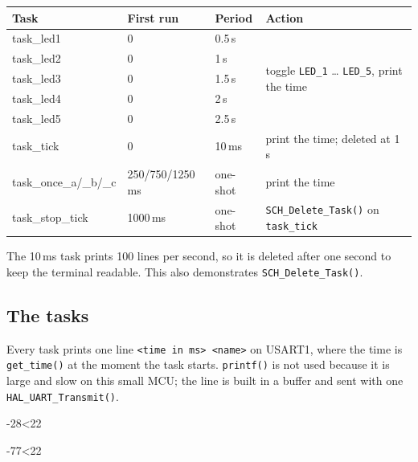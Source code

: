 \documentclass[12pt,a4paper]{article}
\numberwithin{figure}{section}
\numberwithin{table}{section}
\newcommand{\srcbody}[4]{}
\newcommand{\src}[4]{\par\ifnum\numexpr#3-#2\relax<22 \noindent\begin{minipage}{\linewidth}\srcbody{#1}{#2}{#3}{#4}\end{minipage}\else\srcbody{#1}{#2}{#3}{#4}\fi\par}
\newcommand{\code}[1]{\texttt{#1}}
\newcommand{\report}[1]{\subsection*{#1}}
\begin{document}
\begin{center}
\small
\begin{tabularx}{\linewidth}{>{\ttfamily}l l l X}
\toprule
\normalfont\textbf{Task} & \textbf{First run} & \textbf{Period} & \textbf{Action}\\
\midrule
task\_led1 & 0 & 0.5\,s & \multirow{5}{=}{toggle \code{LED\_1} \ldots{} \code{LED\_5}, print the time}\\
task\_led2 & 0 & 1\,s & \\
task\_led3 & 0 & 1.5\,s & \\
task\_led4 & 0 & 2\,s & \\
task\_led5 & 0 & 2.5\,s & \\
task\_tick & 0 & 10\,ms & print the time; deleted at 1\,s\\
task\_once\_a/\_b/\_c & 250/750/1250\,ms & one-shot & print the time\\
task\_stop\_tick & 1000\,ms & one-shot & \code{SCH\_Delete\_Task()} on \code{task\_tick}\\
\bottomrule
\end{tabularx}
\end{center}
The 10\,ms task prints 100 lines per second, so it is deleted after one second to keep the terminal readable. This also demonstrates \code{SCH\_Delete\_Task()}.

\report{The tasks}
Every task prints one line \code{<time in ms> <name>} on USART1, where the time is \code{get\_time()} at the moment the task starts. \code{printf()} is not used because it is large and slow on this small MCU; the line is built in a buffer and sent with one \code{HAL\_UART\_Transmit()}.
\src{tasks.c}{28}{55}{Printing a timestamp and the first LED task}
\src{tasks.c}{77}{103}{The 10\,ms task, the one-shot tasks and the delete task}
\end{document}
